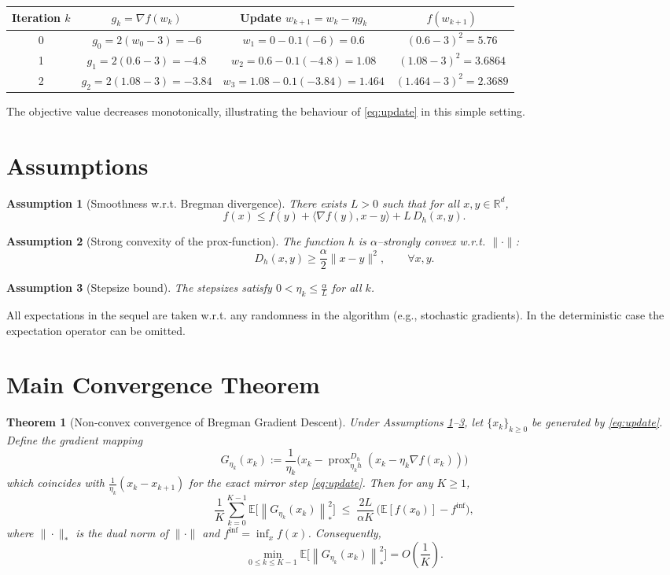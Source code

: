 \documentclass{article}
\newtheorem{theorem}{Theorem}
\newtheorem{assumption}{Assumption}
\newcommand{\E}{\mathbb{E}}
\newcommand{\norm}[1]{\left\|#1\right\|}
\newcommand{\ip}[2]{\langle #1,#2\rangle}
\newcommand{\grad}{\nabla}
\newcommand{\D}{D_{h}}
\newcommand{\R}{\mathbb{R}}
\begin{document}
\begin{center}
\begin{tabular}{c|c|c|c}
Iteration $k$ & $g_k=\grad f(w_k)$ & Update $w_{k+1}=w_k-\eta g_k$ & $f(w_{k+1})$\\\hline
0 & $g_0=2(w_0-3)=-6$ & $w_1=0-0.1(-6)=0.6$ & $(0.6-3)^2=5.76$\\
1 & $g_1=2(0.6-3)=-4.8$ & $w_2=0.6-0.1(-4.8)=1.08$ & $(1.08-3)^2=3.6864$\\
2 & $g_2=2(1.08-3)=-3.84$ & $w_3=1.08-0.1(-3.84)=1.464$ & $(1.464-3)^2=2.3689$\\
\end{tabular}
\end{center}
The objective value decreases monotonically, illustrating the behaviour of \eqref{eq:update} in this simple setting.

\newpage

\section*{Assumptions}
\begin{assumption}[Smoothness w.r.t. Bregman divergence]
\label{as:smooth}
There exists $L>0$ such that for all $x,y\in\R^{d}$,
\[
f(x)\le f(y)+\ip{\grad f(y)}{x-y}+L\,\D(x,y).
\]
\end{assumption}
\begin{assumption}[Strong convexity of the prox‑function]
\label{as:hstrong}
The function $h$ is $\alpha$–strongly convex w.r.t. $\|\cdot\|$:
\[
\D(x,y)\ge \frac{\alpha}{2}\|x-y\|^{2},\qquad\forall x,y.
\]
\end{assumption}
\begin{assumption}[Stepsize bound]
\label{as:stepsize}
The stepsizes satisfy $0<\eta_k\le \frac{\alpha}{L}$ for all $k$.
\end{assumption}
All expectations in the sequel are taken w.r.t. any randomness in the algorithm (e.g., stochastic gradients). In the deterministic case the expectation operator can be omitted.

\section*{Main Convergence Theorem}
\begin{theorem}[Non‑convex convergence of Bregman Gradient Descent]
\label{thm:main}
Under Assumptions \ref{as:smooth}–\ref{as:stepsize}, let $\{x_k\}_{k\ge0}$ be generated by \eqref{eq:update}. Define the \emph{gradient mapping}
\[
G_{\eta_k}(x_k):=\frac{1}{\eta_k}\bigl(x_k-\operatorname{prox}_{\eta_k h}^{\D}(x_k-\eta_k\grad f(x_k))\bigr)
\]
which coincides with $\frac{1}{\eta_k}(x_k-x_{k+1})$ for the exact mirror step \eqref{eq:update}. Then for any $K\ge1$,
\begin{equation}
\label{eq:averaged-bound}
\frac{1}{K}\sum_{k=0}^{K-1}\E\!\bigl[\norm{G_{\eta_k}(x_k)}_{*}^{2}\bigr]
\;\le\;
\frac{2L}{\alpha K}\,\bigl(\E[f(x_0)]-f^{\inf}\bigr),
\end{equation}
where $\|\cdot\|_{*}$ is the dual norm of $\|\cdot\|$ and $f^{\inf}=\inf_{x}f(x)$. Consequently,
\[
\min_{0\le k\le K-1}\E\!\bigl[\norm{G_{\eta_k}(x_k)}_{*}^{2}\bigr]
=O\!\left(\frac{1}{K}\right).
\]
\end{theorem}
\end{document}
